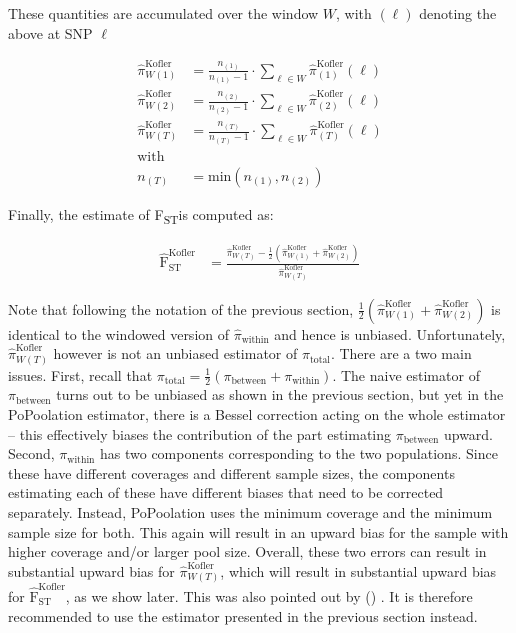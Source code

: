 \documentclass[a4paper,fontsize=9pt,DIV=14]{scrartcl}
\newcommand{\fst}{F\textsubscript{ST}}
\newcommand\citeay[1]{\citeauthor{#1} (\citeyear{#1}) \cite{#1}}
\begin{document}
These quantities are accumulated over the window $W$, with $(\ell)$ denoting the above at SNP $\ell$

\begin{align}
    \label{eq:PoPoolation2FstWindow:1}
    \widehat{\pi}_{W(1)}^\text{Kofler} &= \frac{n_{(1)}}{n_{(1)}-1} \cdot \sum_{\ell\in W} \widehat{\pi}_{(1)}^\text{Kofler}(\ell)\\
    \label{eq:PoPoolation2FstWindow:2}
    \widehat{\pi}_{W(2)}^\text{Kofler} &= \frac{n_{(2)}}{n_{(2)}-1} \cdot \sum_{\ell\in W} \widehat{\pi}_{(2)}^\text{Kofler}(\ell)\\
    \label{eq:PoPoolation2FstWindow:T}
    \widehat{\pi}_{W(T)}^\text{Kofler} &= \frac{n_{(T)}}{n_{(T)}-1} \cdot \sum_{\ell\in W}  \widehat{\pi}_{(T)}^\text{Kofler}(\ell)\\
    \nonumber
    \mbox{with} \\
    \nonumber
    n_{(T)} &= \mbox{min} \left( n_{(1)}, n_{(2)} \right)
\end{align}

Finally, the estimate of \fst is computed as:

\begin{align}
    \label{eq:PoPoolation2FstEst}
    \widehat{\text{F}}_\text{ST}^\text{Kofler} &= \frac{ \widehat{\pi}_{W(T)}^\text{Kofler} - \frac{1}{2} \left(     \widehat{\pi}_{W(1)}^\text{Kofler} +     \widehat{\pi}_{W(2)}^\text{Kofler}  \right)}{ \widehat{\pi}_{W(T)}^\text{Kofler}}
\end{align}

Note that following the notation of the previous section, $\frac{1}{2}\left(\widehat{\pi}_{W(1)}^\text{Kofler} + \widehat{\pi}_{W(2)}^\text{Kofler}\right)$ is identical to the windowed version of $\widehat{\pi}_\text{within}$ and hence is unbiased.  Unfortunately, $\widehat{\pi}_{W(T)}^\text{Kofler}$ however is not an unbiased estimator of $\pi_\text{total}$.  There are a two main issues.  First, recall that $\pi_\text{total} = \frac{1}{2}\left(\pi_\text{between}  + \pi_\text{within} \right)$.  The naive estimator of $\pi_\text{between}$ turns out to be unbiased as shown in the previous section, but yet in the PoPoolation estimator, there is a Bessel correction acting on the whole estimator -- this effectively biases the contribution of the part estimating $\pi_\text{between}$ upward.  Second, $\pi_\text{within}$ has two components corresponding to the two populations.  Since these have different coverages and different sample sizes, the components estimating each of these have different biases that need to be corrected separately.  Instead, PoPoolation uses the minimum coverage and the minimum sample size for both.  This again will result in an upward bias for the sample with higher coverage and/or larger pool size.  Overall, these two errors can result in substantial upward bias for $\widehat{\pi}_{W(T)}^\text{Kofler}$, which will result in substantial upward bias for $\widehat{\text{F}}_\text{ST}^\text{Kofler}$, as we show later.  This was also pointed out by \citeay{Hivert2018}. It is therefore recommended to use the estimator presented in the previous section instead.
\end{document}
